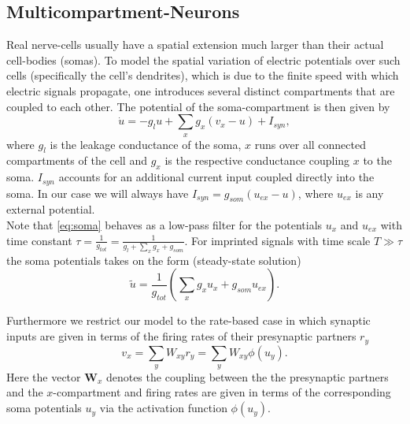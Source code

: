 \documentclass[12pt,a4paper]{article}
\begin{document}
\subsection{Multicompartment-Neurons}
Real nerve-cells usually have a spatial extension much larger than their actual cell-bodies (somas). To model the spatial variation of electric potentials over such cells (specifically the cell's dendrites), which is due to the finite speed with which electric signals propagate, one introduces several distinct compartments that are coupled to each other. The potential of the soma-compartment is then given by
\begin{equation}
\dot{u} = -g_lu + \sum_xg_x(v_x-u) + I_{syn}, \label{eq:soma}
\end{equation}  
where $g_l$ is the leakage conductance of the soma, $x$ runs over all connected compartments of the cell and $g_x$ is the respective conductance coupling $x$ to the soma. $I_{syn}$ accounts for an additional current input coupled directly into the soma. In our case we will always have $I_{syn} = g_{som}(u_{ex}-u)$, where $u_{ex}$ is any external potential.\\
Note that \eqref{eq:soma} behaves as a low-pass filter for the potentials $u_x$ and $u_{ex}$ with time constant $\tau = \frac{1}{g_{tot}} = \frac{1}{g_l + \sum_x g_x + g_{som}}$. For imprinted signals with time scale $T\gg\tau$ the soma potentials takes on the form (steady-state solution)
\begin{equation}
\tilde{u} = \frac{1}{g_{tot}}\left(\sum_x g_xu_x + g_{som}u_{ex}\right).
\end{equation}

Furthermore we restrict our model to the rate-based case in which synaptic inputs are given in terms of the firing rates of their presynaptic partners $r_y$
\begin{equation}
v_x = \sum_yW_{xy}r_y = \sum_yW_{xy}\phi(u_y).
\end{equation}
Here the vector $\bm{W}_x$ denotes the coupling between the the presynaptic partners and the $x$-compartment and firing rates are given in terms of the corresponding soma potentials $u_y$ via the activation function $\phi(u_y)$.
\end{document}
